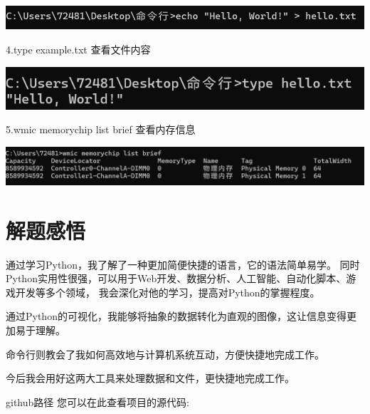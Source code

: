 \documentclass{article}
\begin{document}
\noindent
\begin{minipage}{\linewidth}
 \centering
  \includegraphics[width=0.5\linewidth]{命令行3.png}
  \label{fig:example}
\end{minipage}


4.type example.txt
查看文件内容

\noindent
\begin{minipage}{\linewidth}
 \centering
  \includegraphics[width=0.5\linewidth]{命令行4.png}
  \label{fig:example}
\end{minipage}

5.wmic memorychip list brief
查看内存信息

\noindent
\begin{minipage}{\linewidth}
 \centering
  \includegraphics[width=0.5\linewidth]{命令行5.png}
  \label{fig:example}
\end{minipage}

\section{解题感悟}
通过学习Python，我了解了一种更加简便快捷的语言，它的语法简单易学。
同时Python实用性很强，可以用于Web开发、数据分析、人工智能、自动化脚本、游戏开发等多个领域，
我会深化对他的学习，提高对Python的掌握程度。

通过Python的可视化，我能够将抽象的数据转化为直观的图像，这让信息变得更加易于理解。

命令行则教会了我如何高效地与计算机系统互动，方便快捷地完成工作。

今后我会用好这两大工具来处理数据和文件，更快捷地完成工作。

github路径
您可以在此查看项目的源代码: 

\url{}
\end{document}

